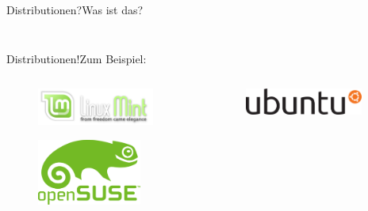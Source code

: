 \begin{frame}{Distributionen?}{Was ist das?}
\begin{columns}
\begin{column}{0.4\textwidth}
\begin{figure}
 \end{figure}
\end{column}
\end{columns}
 \end{frame}



\begin{frame}{Distributionen!}{Zum Beispiel:}
\begin{columns}
\begin{column}{0.5\textwidth}
\begin{figure}
\includegraphics[width=0.9\textwidth]{resources/640px-Linux_Mint_logo_and_wordmark}
\end{figure}

\begin{figure}
\includegraphics[width=0.8\textwidth]{resources/640px-OpenSUSE_Logo}
\end{figure}

 \end{column}
\begin{column}{0.5\textwidth}

\begin{figure}
\includegraphics[width=0.9\textwidth]{resources/640px-Ubuntu_logo}
\end{figure}


\end{column}
\end{columns}
\end{frame}
